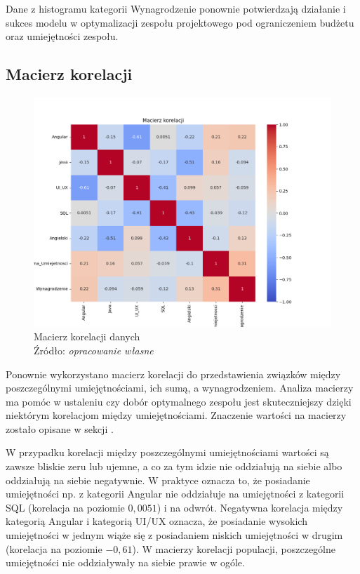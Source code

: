         \par Dane z histogramu kategorii Wynagrodzenie ponownie potwierdzają działanie i sukces modelu w optymalizacji zespołu projektowego pod ograniczeniem budżetu oraz umiejętności zespołu.
    
    \subsection{Macierz korelacji}
    \begin{figure}[H]
        \centering
        \includegraphics[width=\linewidth]{chapters/Images/korelacja_optimal.png}
        \cprotect\caption{Macierz korelacji danych\\ Źródło:\textit{ opracowanie własne}}
        \label{fig:korelacja_optimal}
    \end{figure}

    \par Ponownie wykorzystano macierz korelacji do przedstawienia związków między poszczególnymi umiejętnościami, ich sumą, a wynagrodzeniem. Analiza macierzy ma pomóc w ustaleniu czy dobór optymalnego zespołu jest skuteczniejszy dzięki niektórym korelacjom między umiejętnościami. Znaczenie wartości na macierzy zostało opisane w sekcji .

    \par W przypadku korelacji między poszczególnymi umiejętnościami wartości są zawsze bliskie zeru lub ujemne, a co za tym idzie nie oddziałują na siebie albo oddziałują na siebie negatywnie. W praktyce oznacza to, że posiadanie umiejętności np. z kategorii Angular nie oddziałuje na umiejętności z kategorii SQL (korelacja na poziomie $0,0051$) i na odwrót. Negatywna korelacja między kategorią Angular i kategorią UI/UX oznacza, że posiadanie wysokich umiejętności w jednym wiąże się z posiadaniem niskich umiejętności w drugim (korelacja na poziomie $-0,61$). W macierzy korelacji populacji, poszczególne umiejętności nie oddziaływały na siebie prawie w ogóle.
    
